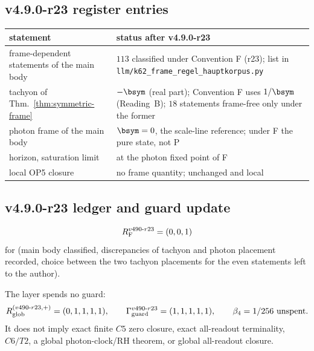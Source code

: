 \subsection*{v4.9.0-r23 register entries}
\label{subsec:v490-r23-register}

\begin{center}
\small
\begin{tabular}{@{}>{\raggedright\arraybackslash}p{}>{\raggedright\arraybackslash}p{}@{}}
\toprule
statement & status after v4.9.0-r23\\
\midrule
frame-dependent statements of the main body & \(113\) classified under Convention F (r23); list in \texttt{llm/k62\_frame\_regel\_hauptkorpus.py}\\
tachyon of Thm.~\ref{thm:symmetric-frame} & \(-\bsym\) (real part); Convention F uses \(1/\bsym\) (Reading~B); \(18\) statements frame-free only under the former\\
photon frame of the main body & \(\bsym=0\), the scale-line reference; under F the pure state, not P\\
horizon, saturation limit & at the photon fixed point of F\\
local OP5 closure & no frame quantity; unchanged and local\\
\bottomrule
\end{tabular}
\end{center}

\subsection*{v4.9.0-r23 ledger and guard update}
\label{subsec:v490-r23-ledger-guard}

\[
R_{\rm F}^{v490\text{-}r23}=(0,0,1)
\]
for (main body classified, discrepancies of tachyon and photon placement recorded, choice between the two tachyon placements for
the even statements left to the author).

The layer spends no guard:
\[
R_{\rm glob}^{(v490\text{-}r23,+)}=(0,1,1,1,1),
\qquad
\Gamma_{\rm guard}^{v490\text{-}r23}=(1,1,1,1,1),
\qquad
\beta_4=1/256\ \text{unspent}.
\]
It does not imply exact finite \(C5\) zero closure, exact all-readout terminality,
\(C6/T2\), a global photon-clock/RH theorem, or global all-readout closure.

